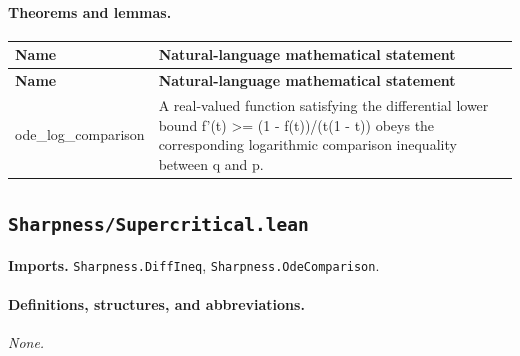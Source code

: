 \documentclass[10pt]{article}
\newcommand{\module}[1]{\texttt{#1}}
\begin{document}
\paragraph{Theorems and lemmas.}
\begin{longtable}{>{\raggedright\arraybackslash}p{} >{\raggedright\arraybackslash}p{}}
\textbf{Name} & \textbf{Natural-language mathematical statement} \\
\hline
\endfirsthead
\textbf{Name} & \textbf{Natural-language mathematical statement} \\
\hline
\endhead
{\footnotesize\ttfamily ode\_\allowbreak{}log\_\allowbreak{}comparison} & A real-valued function satisfying the differential lower bound f'(t) >= (1 - f(t))/(t(1 - t)) obeys the corresponding logarithmic comparison inequality between q and p. \\[0.45em]
\end{longtable}

\subsection*{\module{Sharpness/Supercritical.lean}}
\textbf{Imports.} \module{Sharpness.DiffIneq}, \module{Sharpness.OdeComparison}.
\paragraph{Definitions, structures, and abbreviations.}
\emph{None.}
\end{document}
